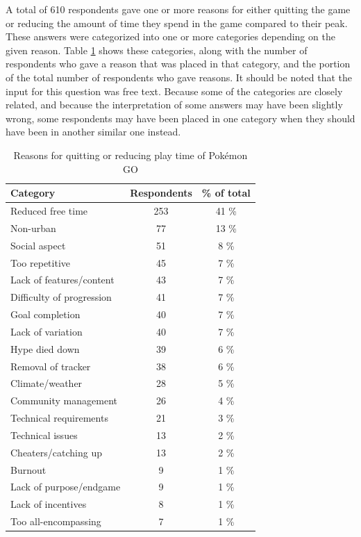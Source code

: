 A total of 610 respondents gave one or more reasons for either quitting the game or reducing the amount of time they spend in the game compared to their peak. These answers were categorized into one or more categories depending on the given reason. Table \ref{tbl:reasons-for-quitting} shows these categories, along with the number of respondents who gave a reason that was placed in that category, and the portion of the total number of respondents who gave reasons. It should be noted that the input for this question was free text. Because some of the categories are closely related, and because the interpretation of some answers may have been slightly wrong, some respondents may have been placed in one category when they should have been in another similar one instead.

\begin{table}[h]
	\centering
	\caption{Reasons for quitting or reducing play time of Pokémon GO}
	\label{tbl:reasons-for-quitting}
	\begin{tabular}{|l|c|c|}
		\hline
		\textbf{Category} & \textbf{Respondents} & \textbf{\% of total}\\
		\hline\hline
		Reduced free time & 253 & 41 \%\\\hline
		Non-urban & 77 & 13 \%\\\hline
		Social aspect & 51 & 8 \%\\\hline
		Too repetitive & 45 & 7 \%\\\hline
		Lack of features/content & 43 & 7 \%\\\hline
		Difficulty of progression & 41 & 7 \%\\\hline
		Goal completion & 40 & 7 \%\\\hline
		Lack of variation & 40 & 7 \%\\\hline
		Hype died down & 39 & 6 \%\\\hline
		Removal of tracker & 38 & 6 \%\\\hline
		Climate/weather & 28 & 5 \%\\\hline
		Community management & 26 & 4 \%\\\hline
		Technical requirements & 21 & 3 \%\\\hline
		Technical issues & 13 & 2 \%\\\hline
		Cheaters/catching up & 13 & 2 \%\\\hline
		Burnout & 9 & 1 \%\\\hline
		Lack of purpose/endgame & 9 & 1 \%\\\hline
		Lack of incentives & 8 & 1 \%\\\hline
		Too all-encompassing & 7 & 1 \%\\\hline
	\end{tabular}
\end{table}

